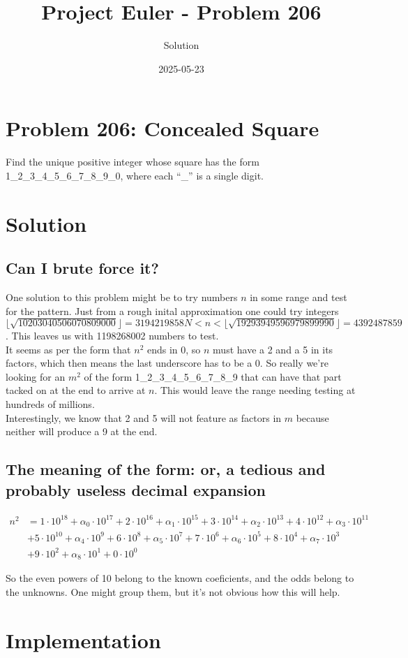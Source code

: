 \documentclass{article}
\title{Project Euler - Problem 206}
\author{Solution}
\date{2025-05-23}
\begin{document}
\maketitle

\section*{Problem 206: Concealed Square}


Find the unique positive integer whose square has the form 1\_2\_3\_4\_5\_6\_7\_8\_9\_0, where each “\_” is a single digit.

\par


\section*{Solution}

\subsection{Can I brute force it?}

One solution to this problem might be to try numbers $n$ in some range and test for the pattern.  Just from a rough inital
approximation one could try integers 
$\lfloor\sqrt{10203040506070809000}\rfloor = 3194219858N < n < \lfloor\sqrt{19293949596979899990}\rfloor = 4392487859$.  
This leaves us with 1198268002 numbers to test.\\

It seems as per the form that $n^2$ ends in 0, so $n$ must have a 2 and a 5 in its factors, which then means the last
 underscore has to be a 0.  So really we're looking for an $m^2$ of the form 1\_2\_3\_4\_5\_6\_7\_8\_9 that can have
 that part tacked on at the end to arrive at $n$.  This would leave the range needing testing at hundreds of millions. \\

Interestingly, we know that 2 and 5 will not feature as factors in $m$ because neither will produce a 9 at the end. \\

\subsection{The meaning of the form: or, a tedious and probably useless decimal expansion}

\begin{align*}
    n^2 &= 1 \cdot 10^{18} + \alpha_0 \cdot 10^{17} + 2 \cdot 10^{16} + \alpha_1 \cdot 10^{15} 
        + 3 \cdot 10^{14} + \alpha_2 \cdot 10^{13} + 4 \cdot 10^{12} + \alpha_3 \cdot 10^{11} \\
        &+ 5 \cdot 10^{10} + \alpha_4 \cdot 10^{9} + 6 \cdot 10^{8} + \alpha_5 \cdot 10^{7} 
        + 7 \cdot 10^{6} + \alpha_6 \cdot 10^{5} + 8 \cdot 10^{4} + \alpha_7 \cdot 10^{3} \\
        &+ 9 \cdot 10^{2} + \alpha_8 \cdot 10^{1} + 0 \cdot 10^{0} 
\end{align*}

So the even powers of 10 belong to the known coeficients, and the odds belong to the unknowns.  One might group
them, but it's not obvious how this will help.

\section*{Implementation}

\end{document}
